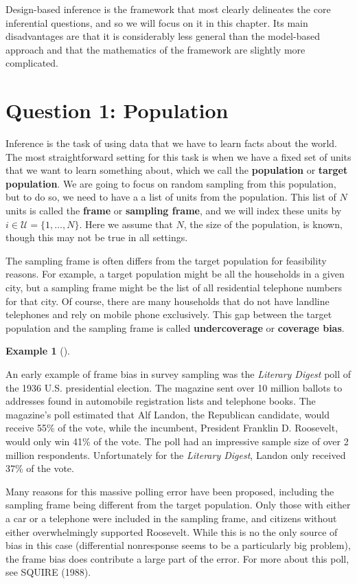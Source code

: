 \documentclass[
  letterpaper,
  DIV=11,
  numbers=noendperiod]{scrreprt}
\theoremstyle{definition}
\theoremstyle{plain}
\theoremstyle{definition}
\newtheorem{example}{Example}[chapter]
\theoremstyle{remark}
\begin{document}
Design-based inference is the framework that most clearly delineates the
core inferential questions, and so we will focus on it in this chapter.
Its main disadvantages are that it is considerably less general than the
model-based approach and that the mathematics of the framework are
slightly more complicated.

\hypertarget{question-1-population}{%
\section{Question 1: Population}\label{question-1-population}}

Inference is the task of using data that we have to learn facts about
the world. The most straightforward setting for this task is when we
have a fixed set of units that we want to learn something about, which
we call the \textbf{population} or \textbf{target population}. We are
going to focus on random sampling from this population, but to do so, we
need to have a a list of units from the population. This list of \(N\)
units is called the \textbf{frame} or \textbf{sampling frame}, and we
will index these units by \(i \in \mathcal{U} = \{1, \ldots, N\}\). Here
we assume that \(N\), the size of the population, is known, though this
may not be true in all settings.

The sampling frame is often differs from the target population for
feasibility reasons. For example, a target population might be all the
households in a given city, but a sampling frame might be the list of
all residential telephone numbers for that city. Of course, there are
many households that do not have landline telephones and rely on mobile
phone exclusively. This gap between the target population and the
sampling frame is called \textbf{undercoverage} or \textbf{coverage
bias}.

\begin{example}[]\protect\hypertarget{exm-frame-bias}{}\label{exm-frame-bias}

An early example of frame bias in survey sampling was the \emph{Literary
Digest} poll of the 1936 U.S. presidential election. The magazine sent
over 10 million ballots to addresses found in automobile registration
lists and telephone books. The magazine's poll estimated that Alf
Landon, the Republican candidate, would receive 55\% of the vote, while
the incumbent, President Franklin D. Roosevelt, would only win 41\% of
the vote. The poll had an impressive sample size of over 2 million
respondents. Unfortunately for the \emph{Literary Digest}, Landon only
received 37\% of the vote.

Many reasons for this massive polling error have been proposed,
including the sampling frame being different from the target population.
Only those with either a car or a telephone were included in the
sampling frame, and citizens without either overwhelmingly supported
Roosevelt. While this is no the only source of bias in this case
(differential nonresponse seems to be a particularly big problem), the
frame bias does contribute a large part of the error. For more about
this poll, see SQUIRE (1988).

\end{example}
\end{document}
